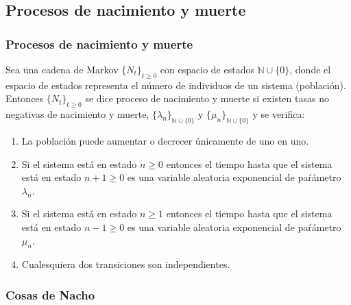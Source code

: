 \documentclass[8pt]{beamer}
\begin{document}
  \subsection{Procesos de nacimiento y muerte}
  \begin{frame}\frametitle{Procesos de nacimiento y muerte}
    Sea una cadena de Markov $\{N_t\}_{t\ge 0}$ con espacio de estados $\mathbb{N}\cup \{0\}$, donde el espacio de estados representa el número de individuos
    de un sistema (población). Entonces $\{N_t\}_{t\ge 0}$ se dice proceso de nacimiento y muerte si existen tasas no negativas de nacimiento y muerte,
    $\{\lambda_n\}_{\mathbb{N}\cup \{0\}}$ y $\{\mu_n\}_{\mathbb{N}\cup \{0\}}$ y se verifica:
    \begin{enumerate}
    \item La población puede aumentar o decrecer únicamente de uno en uno.
    \item Si el sistema está en estado $n\ge 0$ entonces el tiempo hasta que el sistema está en estado $n+1 \ge 0$ es una variable aleatoria exponencial
      de paŕámetro $\lambda_n$.
    \item Si el sistema está en estado $n\ge 1$ entonces el tiempo hasta que el sistema está en estado $n-1 \ge 0$ es una variable aleatoria exponencial
      de paŕámetro $\mu_n$.
    \item Cualesquiera dos transiciones son independientes.
    \end{enumerate}
  \end{frame}

  \begin{frame}\frametitle{Cosas de Nacho}

  \end{frame}
\end{document}
